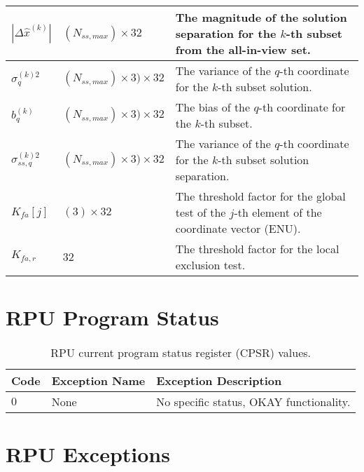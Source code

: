 \documentclass[11pt]{article}
\begin{document}
\begin{table}[htbp]
\begin{center}
\begin{tabular}{|m{1.5cm}|m{2.5cm}|m{7cm}|}
    $|\Delta\hat{x}^{(k)}|$ & $(N_{ss,max}) \times 32$ & The magnitude of the solution separation for the $k$-th subset from the all-in-view set.\\ \hline

    $\sigma_q^{(k)2}$ & $(N_{ss,max}) \times 3) \times 32$ & The variance of the $q$-th coordinate for the $k$-th subset solution.\\ \hline

    $b_q^{(k)}$ & $(N_{ss,max}) \times 3) \times 32$ & The bias of the $q$-th coordinate for the $k$-th subset.\\ \hline

    $\sigma_{ss,q}^{(k)2}$ & $(N_{ss,max}) \times 3) \times 32$ & The variance of the $q$-th coordinate for the $k$-th subset solution separation.\\ \hline

    $K_{fa}[j]$ & $(3) \times 32$ & The threshold factor for the global test of the $j$-th element of the coordinate vector (ENU).\\ \hline

    $K_{fa,r}$ & $32$ & The threshold factor for the local exclusion test.\\ \hline
  \end{tabular}
\end{center}
\end{table}

\section{RPU Program Status}

\begin{table}[htbp] \begin{center}
  \caption{RPU current program status register (CPSR) values.}
  \label{tab:rpu_cpsr_codes}
  \begin{tabular}{|m{1.5cm}|m{3.5cm}|m{7cm}|}
    \hline
    \textbf{Code} & \textbf{Exception Name} & \textbf{Exception Description}\\ \hline

    $0$ & None & No specific status, OKAY functionality.\\ \hline
  \end{tabular}
\end{center}
\end{table}

\section{RPU Exceptions}
\end{document}
